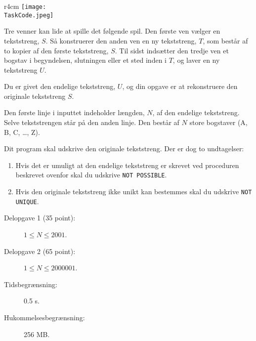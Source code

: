 \documentclass{boi2014-dk}
\renewcommand{\TaskCode}{friends}
\begin{document}
    \begin{wrapfigure}{r}{4cm}
        \vspace{-24pt}
		\texttt{[image: \\TaskCode.jpeg]}
	\end{wrapfigure}
	Tre venner kan lide at spille det følgende spil.
	Den første ven vælger en tekststreng, $S$.
	Så konstruerer den anden ven en ny tekststreng, $T$, som
	består af to kopier af den første tekststreng, $S$.
	Til sidst indsætter den tredje ven et bogstav i begyndelsen, slutningen
    eller et sted inden i $T$, og laver en ny tekststreng $U$.

    \Task
    Du er givet den endelige tekststreng, $U$, og din
    opgave er at rekonstruere den originale tekststreng $S$.

    \Input
    Den første linje i inputtet indeholder længden, $N$, af den
    endelige tekststreng.
	Selve tekststrengen står på den anden linje.
    Den består af $N$ store bogstaver (A, B, C, \ldots, Z).

    \Output
	Dit program skal udskrive den originale tekststreng.
	Der er dog to undtagelser:
    \begin{enumerate}
    	\item Hvis det er umuligt at den endelige tekststreng er
    	skrevet ved proceduren beskrevet ovenfor skal du udskrive
    	 {\tt NOT POSSIBLE}.
    	\item Hvis den originale tekststreng ikke unikt kan bestemmes
    	skal du udskrive {\tt NOT UNIQUE}.
    \end{enumerate}


    \Examples


    \Scoring

    \begin{description}
        \item[Delopgave 1 (35 point):] $1 \le N \le 2001$.
        \item[Delopgave 2 (65 point):] $1 \le N \le 2000001$.
    \end{description}

    \Constraints

    \begin{description}
        \item[Tidsbegrænsning:] 0.5 s.
        \item[Hukommelsesbegrænsning:] 256 MB.
    \end{description}
\end{document}
